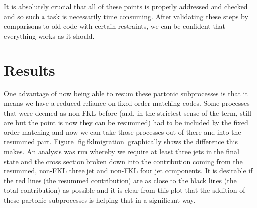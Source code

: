 It is absolutely crucial that all of these points is properly addressed and checked and so such a task is necessarily time consuming. After validating these steps by comparisons to old code with certain restraints, we can be confident that everything works as it should. 
\section{Results}
One advantage of now being able to resum these partonic subprocesses is that it means we have a reduced reliance on fixed order matching codes. Some processes that were deemed as non-FKL before (and, in the strictest sense of the term, still are but the point is now they can be resummed) had to be included by the fixed order matching and now we can take those processes out of there and into the resummed part. Figure \ref{fig:fklmigration} graphically shows the difference this makes. An analysis was run whereby we require at least three jets in the final state and the cross section broken down into the contribution coming from the resummed, non-FKL three jet and non-FKL four jet components. It is desirable if the red lines (the resummed contribution) are as close to the black lines (the total contribution) as possible and it is clear from this plot that the addition of these partonic subprocesses is helping that in a significant way.  

